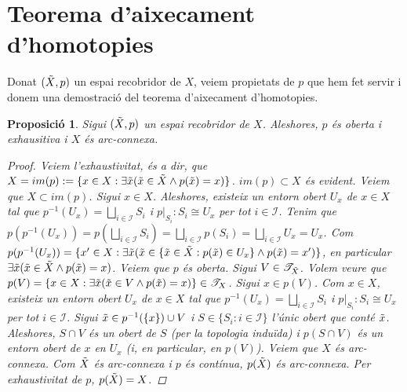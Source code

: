 \documentclass[compress,10pt]{article}
\newtheorem{proposicio}{Proposició}[section]
\theoremstyle{definition}
\begin{document}
\section{Teorema d'aixecament d'homotopies}\label{Tah}
Donat $(\Tilde{X},p)$ un espai recobridor de $X$, veiem propietats de $p$ que hem fet servir i donem una demostració del teorema d'aixecament d'homotopies.
\begin{proposicio}
    Sigui $(\Tilde{X},p)$ un espai recobridor de $X$. Aleshores, $p$ és oberta i exhausitiva i $X$ és arc-connexa.
    \begin{proof}
        Veiem l'exhaustivitat, és a dir, que $X=im(p):=\{x\in X:\exists\Tilde{x}(\Tilde{x}\in\Tilde{X}\land p(\Tilde{x})=x)\}$. $im(p)\subset X$ és evident. Veiem que $X\subset im(p)$. Sigui $x\in X$. Aleshores, existeix un entorn obert $U_{x}$ de $x\in X$ tal que $p^{-1}(U_{x})=\bigsqcup_{i\in\mathscr{I}}S_{i}$ i $p|_{S_{i}}:S_{i}\cong U_{x}$ per tot $i\in\mathscr{I}$. Tenim que $p(p^{-1}(U_{x}))=p(\bigsqcup_{i\in\mathscr{I}}S_{i})=\bigsqcup_{i\in\mathscr{I}}p(S_{i})=\bigsqcup_{i\in\mathscr{I}}U_{x}=U_{x}$. Com $p(p^{-1}(U_{x}))=\{x'\in X:\exists\Tilde{x}(\Tilde{x}\in\{\Tilde{x}\in\Tilde{X}:p(\Tilde{x})\in U_{x}\}\land p(\Tilde{x})=x')\}$, en particular $\exists\Tilde{x}(\Tilde{x}\in\Tilde{X}\land p(\Tilde{x})=x)$.\newline
        Veiem que $p$ és oberta. Sigui $V\in\mathscr{T}_{\Tilde{X}}$. Volem veure que $p(V)=\{x\in X:\exists\Tilde{x}(\Tilde{x}\in V\land p(\Tilde{x})=x)\}\in\mathscr{T}_{X}$. Sigui $x\in p(V)$. Com $x\in X$, existeix un entorn obert $U_{x}$ de $x\in X$ tal que $p^{-1}(U_{x})=\bigsqcup_{i\in\mathscr{I}}S_{i}$ i $p|_{S_{i}}:S_{i}\cong U_{x}$ per tot $i\in\mathscr{I}$. Sigui $\Tilde{x}\in p^{-1}(\{x\})\cup V$ i $S\in\{S_{i}:i\in\mathscr{I}\}$ l'únic obert que conté $\Tilde{x}$. Aleshores, $S\cap V$ és un obert de $S$ (per la topologia induïda) i $p(S\cap V)$ és un entorn obert de $x$ en $U_{x}$ (i, en particular, en $p(V)$).\newline
        Veiem que $X$ és arc-connexa. Com $\Tilde{X}$ és arc-connexa i $p$ és contínua, $p(\Tilde{X})$ és arc-connexa. Per exhaustivitat de $p$, $p(\Tilde{X})=X$.
    \end{proof}
\end{proposicio}
\end{document}
